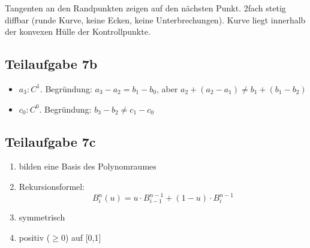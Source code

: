 \documentclass[a4paper]{scrartcl}
\begin{document}
Tangenten an den Randpunkten zeigen auf den nächsten Punkt. 2fach stetig diffbar (runde Kurve, keine Ecken, keine Unterbrechungen). Kurve liegt innerhalb der konvexen Hülle der Kontrollpunkte.

\subsection*{Teilaufgabe 7b}

\begin{itemize}
    \item $a_3: C^1$. Begründung: $a_3 - a_2 = b_1 - b_0$, aber $a_2 + (a_2-a_1) \neq b_1 + (b_1 - b_2)$
    \item $c_0: C^0$. Begründung: $b_3-b_2 \neq c_1 - c_0$
\end{itemize}

\subsection*{Teilaufgabe 7c}
\begin{enumerate}
    \item bilden eine Basis des Polynomraumes
    \item Rekursionsformel: \[B^n_i(u) = u \cdot B^{n-1}_{i-1} + (1-u) \cdot B^{n-1}_{i} \]
    \item symmetrisch
    \item positiv ($\geq 0$) auf [0,1]
\end{enumerate}
\end{document}
